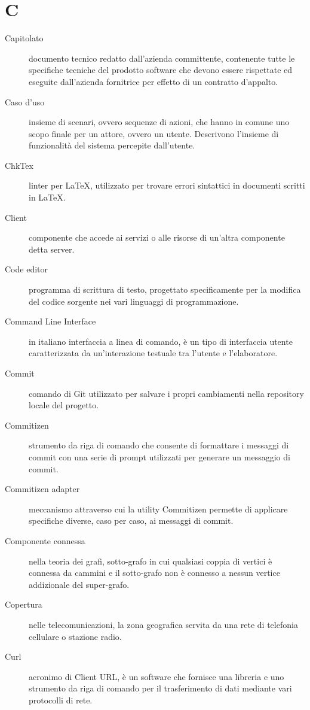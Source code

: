 \documentclass{article}
\begin{document}
\section{C}
\begin{description}
  \item[Capitolato] documento tecnico redatto dall'azienda committente, contenente tutte le specifiche tecniche del prodotto software che devono essere rispettate ed eseguite dall'azienda fornitrice per effetto di un contratto d'appalto.
  \item[Caso d'uso] insieme di scenari, ovvero sequenze di azioni, che hanno in comune uno scopo finale per un attore, ovvero un utente. Descrivono l'insieme di funzionalità del sistema percepite dall'utente.
  \item[ChkTex] linter per LaTeX, utilizzato per trovare errori sintattici in documenti scritti in LaTeX.
  \item[Client] componente che accede ai servizi o alle risorse di un'altra componente detta server.
  \item[Code editor] programma di scrittura di testo, progettato specificamente per la modifica del codice sorgente nei vari linguaggi di programmazione.
  \item[Command Line Interface] in italiano interfaccia a linea di comando, è un tipo di interfaccia utente caratterizzata da un'interazione testuale tra l'utente e l'elaboratore.
  \item[Commit] comando di Git utilizzato per salvare i propri cambiamenti nella repository locale del progetto.
  \item[Commitizen] strumento da riga di comando che consente di formattare i messaggi di commit con una serie di prompt utilizzati per generare un messaggio di commit.
  \item[Commitizen adapter] meccanismo attraverso cui la utility Commitizen permette di applicare specifiche diverse, caso per caso, ai messaggi di commit.
  \item[Componente connessa] nella teoria dei grafi, sotto-grafo in cui qualsiasi coppia di vertici è connessa da cammini e il sotto-grafo non è connesso a nessun vertice addizionale del super-grafo.
  \item[Copertura] nelle telecomunicazioni, la zona geografica servita da una rete di telefonia cellulare o stazione radio.
  \item[Curl] acronimo di Client URL, è un software che fornisce una libreria e uno strumento da riga di comando per il trasferimento di dati mediante vari protocolli di rete.
\end{description}
\newpage
\end{document}
